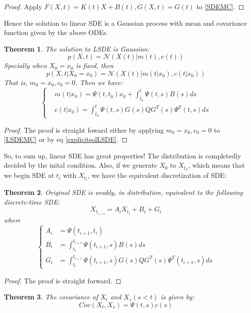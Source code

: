 \documentclass{article}
\newtheorem{theorem}{Theorem}
\begin{document}
\begin{proof}
    Apply $F(X, t)=K(t)X + B(t), G(X, t)=G(t)$ to \ref{SDEMC}.
\end{proof}

Hence the solution to linear SDE is a Gaussian process with mean and covariance function given by the above ODEs.
\begin{theorem}
The solution to LSDE is Gaussian:
\begin{equation}
    p(X, t) = \mathcal{N}(X(t)|m(t), c(t))
\end{equation}
Specially when $X_0 = x_0$ is fixed, then 
\begin{equation}\label{transitiondensity}
    p(X,t|X_0=x_0) = \mathcal{N}(X(t)|m(t|x_0), c(t|x_0))
\end{equation}
That is, $m_0 = x_0, c_0 = 0$. Then we have:
\begin{equation}
    \left\{
        \begin{aligned}
            &m(t|x_0) = \Psi(t, t_0)x_0 + \int_{t_0}^t \Psi(t, s)B(s)ds\\
            &c(t|x_0) = \int_{t_0}^t \Psi(t, s)G(s)QG^T(s)\Psi^T(t, s)ds
        \end{aligned}
    \right.
\end{equation}
\end{theorem}
\begin{proof}
    The proof is straight foward either by applying $m_0 = x_0, c_0 = 0$ to \ref{LSDEMC} or by eq \ref{explicitsolLSDE}.
\end{proof}
So, to sum up, linear SDE has great properties! The distribution is completedly decided by the inital condition.
Also, if we generate $X_0$ to $X_{t_k}$, which means that we begin SDE at $t_i$ with $X_{t_i}$, we have the equivalent discretization of SDE:
\begin{theorem}
    Original SDE is weakly, in distribution, equivalent to the following discrete-time SDE:
    \begin{equation}\label{DTSDE}
        X_{t_{i+1}} = A_iX_{t_i} + B_i + G_i
    \end{equation} 
    where
    \begin{equation}\left\{
        \begin{aligned}
            A_i &= \Psi(t_{i+1}, t_i)\\
            B_i &= \int_{t_i}^{t_{i+1}} \Psi(t_{i+1}, s)B(s)ds\\
            G_i &= \int_{t_i}^{t_{i+1}} \Psi(t_{i+1}, s)G(s)QG^T(s)\Psi^T(t_{i+1}, s)ds
        \end{aligned}\right.
    \end{equation}
\end{theorem}
\begin{proof}
    The proof is straight forward.
\end{proof}
\begin{theorem}
    The covariance of $X_t$ and $X_s(s<t)$ is given by:
    \begin{equation}
        Cov(X_t, X_s) = \Psi(t, s)c(s)
    \end{equation}
\end{theorem}
\end{document}
